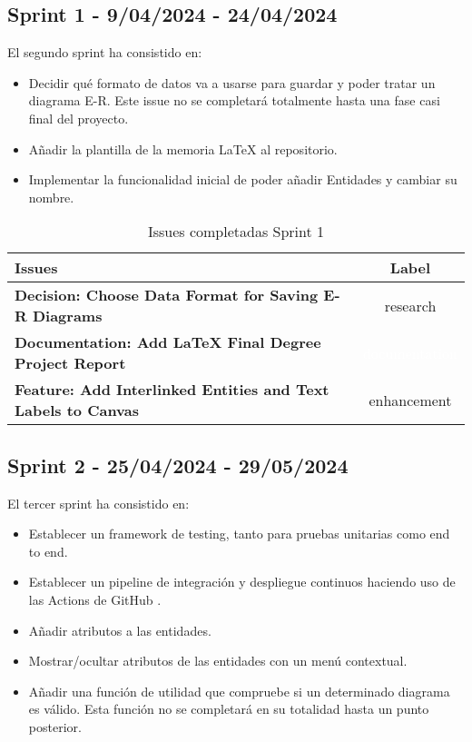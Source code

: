 \subsection{Sprint 1 - 9/04/2024 - 24/04/2024 }
El segundo sprint ha consistido en:
\begin{itemize}
    \item Decidir qué formato de datos va a usarse para guardar y poder tratar un diagrama E-R. Este issue no se completará totalmente hasta una fase casi final del proyecto.
    \item Añadir la plantilla de la memoria LaTeX al repositorio.
    \item Implementar la funcionalidad inicial de poder añadir Entidades y cambiar su nombre.
\end{itemize}


\begin{table}[ht!]
    \centering
    \resizebox{14cm}{!} {
    \begin{tabular}{|l|c|}
    \hline
    \rowcolor[rgb]{0.9, 0.9, 0.9}
    \textbf{Issues} & \textbf{Label} \\ \hline
    \textbf{Decision: Choose Data Format for Saving E-R Diagrams} & \cellcolor[rgb]{0.83, 0.77, 0.97}research \\ \hline 
    \textbf{Documentation: Add LaTeX Final Degree Project Report} & \cellcolor[rgb]{0.0, 0.46, 0.79}\textcolor{white}{documentation} \\ \hline 
    \textbf{Feature: Add Interlinked Entities and Text Labels to Canvas} & \cellcolor[rgb]{0.64, 0.93, 0.94}enhancement \\ \hline 
    \end{tabular}}
    \caption{Issues completadas Sprint 1}
\end{table}


\subsection{Sprint 2 - 25/04/2024 - 29/05/2024 }
El tercer sprint ha consistido en:
\begin{itemize}
    \item Establecer un framework de testing, tanto para pruebas unitarias como end to end.
    \item Establecer un pipeline de integración y despliegue continuos haciendo uso de las Actions de GitHub \cite{github-actions}.
    \item Añadir atributos a las entidades.
    \item Mostrar/ocultar atributos de las entidades con un menú contextual.
    \item Añadir una función de utilidad que compruebe si un determinado diagrama es válido. Esta función no se completará en su totalidad hasta un punto posterior.
\end{itemize}

